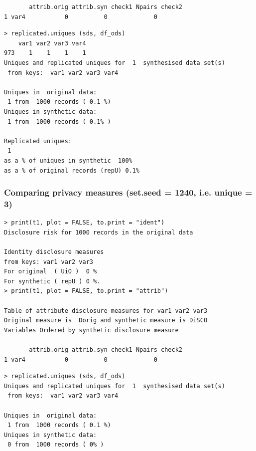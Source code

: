 \documentclass[t,8pt,utfx8]{beamer}
\begin{document}
\begin{spacing}{1.25}
\begin{frame}[fragile]
\begin{minipage}[t]{0.48\textwidth}
\begin{lstlisting}
       attrib.orig attrib.syn check1 Npairs check2
1 var4           0          0             0       
\end{lstlisting}
\end{minipage}%
  \hfill%
\begin{minipage}[t]{0.48\textwidth}
\begin{lstlisting}
> replicated.uniques (sds, df_ods)
    var1 var2 var3 var4
973    1    1    1    1
Uniques and replicated uniques for  1  synthesised data set(s)
 from keys:  var1 var2 var3 var4 

Uniques in  original data:
 1 from  1000 records ( 0.1 %) 
Uniques in synthetic data:
 1 from  1000 records ( 0.1% )

Replicated uniques:
 1
as a % of uniques in synthetic  100%
as a % of original records (repU) 0.1%
\end{lstlisting}
\end{minipage}
\end{frame}

\begin{frame}[fragile]
\frametitle{Comparing privacy measures (set.seed = 1240, i.e. unique = 3)}
  


\begin{minipage}[t]{0.48\textwidth}
\begin{lstlisting}
> print(t1, plot = FALSE, to.print = "ident")
Disclosure risk for 1000 records in the original data

Identity disclosure measures
from keys: var1 var2 var3 
For original  ( UiO )  0 %
For synthetic ( repU ) 0 %.
> print(t1, plot = FALSE, to.print = "attrib")

Table of attribute disclosure measures for var1 var2 var3 
Original measure is  Dorig and synthetic measure is DiSCO 
Variables Ordered by synthetic disclosure measure

       attrib.orig attrib.syn check1 Npairs check2
1 var4           0          0             0       
\end{lstlisting}
\end{minipage}%
  \hfill%
\begin{minipage}[t]{0.48\textwidth}
\begin{lstlisting}
> replicated.uniques (sds, df_ods)
Uniques and replicated uniques for  1  synthesised data set(s)
 from keys:  var1 var2 var3 var4 

Uniques in  original data:
 1 from  1000 records ( 0.1 %) 
Uniques in synthetic data:
 0 from  1000 records ( 0% )


\end{lstlisting}
\end{minipage}
\end{frame}
\end{spacing}
\end{document}

